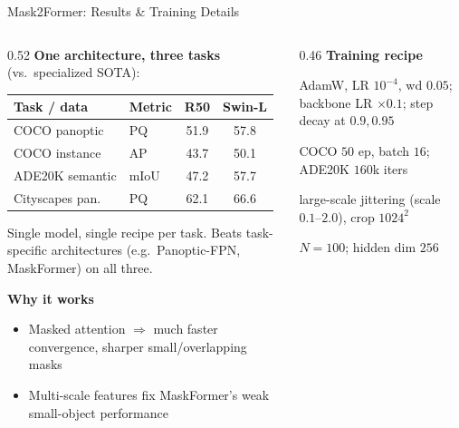 \begin{frame}{Mask2Former: Results \& Training Details}

  \begin{columns}[t]
    \begin{column}{0.52\textwidth}
      \textbf{One architecture, three tasks} (vs.\ specialized SOTA):
      \begin{center}
        \footnotesize
        \begin{tabular}{llcc}
          \toprule
          \textbf{Task / data} & \textbf{Metric} & \textbf{R50} & \textbf{Swin-L} \\
          \midrule
          COCO panoptic   & PQ   & 51.9 & 57.8 \\
          COCO instance   & AP   & 43.7 & 50.1 \\
          ADE20K semantic & mIoU & 47.2 & 57.7 \\
          Cityscapes pan. & PQ   & 62.1 & 66.6 \\
          \bottomrule
        \end{tabular}
      \end{center}
      {\scriptsize Single model, single recipe per task. Beats task-specific architectures (e.g.\ Panoptic-FPN, MaskFormer) on all three.}

      \vspace{0.5em}
      \textbf{Why it works}
      \begin{itemize}\setlength\itemsep{1pt}
        \item Masked attention $\Rightarrow$ much faster convergence, sharper small/overlapping masks
        \item Multi-scale features fix MaskFormer's weak small-object performance
      \end{itemize}
    \end{column}
    \begin{column}{0.46\textwidth}
      \textbf{Training recipe}
      \begin{description}\setlength\itemsep{1pt}
        \item[Optimizer] AdamW, LR $10^{-4}$, wd $0.05$; backbone LR $\times 0.1$; step decay at $0.9,0.95$
        \item[Schedule] COCO $50$ ep, batch $16$; ADE20K $160$k iters
        \item[Augment] large-scale jittering (scale $0.1\text{--}2.0$), crop $1024^2$
        \item[Queries] $N=100$; hidden dim $256$
      \end{description}


\end{column}
\end{columns}
\end{frame}
